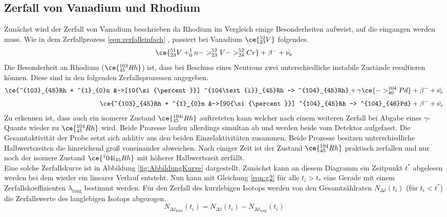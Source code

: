 \subsection{Zerfall von Vanadium und Rhodium}
Zunächst wird der Zerfall von Vanadium beschrieben da Rhodium im Vergleich einige Besonderheiten aufweist, auf die eingangen werden muss.
Wie in dem Zerfallprozess \eqref{eqn:zerfalleinfach} , passiert bei Vanadium $\ce{^{52}_{23}V}$ folgendes.
\begin{equation}
\ce{^{51}_{23}V + ^{1}_{0}n -> ^{52}_{23}V -> ^{52}_{24}Cr} + {\beta}^{-} + \bar{\nu_{e}} 
\end{equation}
Die Besonderheit an Rhodium ($\ce{^{103}_{45}Rh}$) ist, dass bei Beschuss eines Neutrons zwei unterschiedliche instabile Zustände resultieren können. 
Diese sind in den folgenden Zerfallsprozessen angegeben.
\begin{align}
\ce{^{103}_{45}Rh + ^{1}_{0}n &->[10{\si{\percent}}] ^{104\text{i}}_{45}Rh -> ^{104}_{45}Rh} + \gamma \ce{-> ^{104}_{46}Pd} + {\beta}^{-} + \bar{\nu_{e}} \\[3pt]
\ce{^{103}_{45}Rh + ^{1}_{0}n &->[90{\si{\percent}}] ^{104}_{45}Rh -> ^{104}_{46}Pd} + {\beta}^{-} + \bar{\nu_{e}} 
\end{align}
Zu erkennen ist, dass auch ein isomerer Zustand $\ce{^{104{\text{i}}}_{45}Rh}$ auftreteten kann welcher nach einem weiteren Zerfall bei Abgabe eines $\gamma$-Quants wieder zu $\ce{^{104}_{45}Rh}$ wird.
Beide Prozesse laufen allerdings simultan ab und werden beide vom Detektor aufgefasst. 
Die Gesamtaktivität der Probe setzt sich additiv aus den beiden Einzelaktivitäten zusammen. Beide Prozesse besitzen unterschiedliche Halbwertszeiten die hinreichend
groß voneinander abweichen. Nach einiger Zeit ist der Zustand $\ce{^{104}_{45}Rh}$ praktisch zerfallen und nur noch der isomere Zustand $\ce{^104{\text{i}}_{45}Rh}$ mit höherer Halbwertszeit zerfällt.
\\
\newline
Eine solche Zerfallskurve ist in Abbildung \ref{fig:AbbildungKurve} dargestellt.
Zunächst kann an diesem Diagramm ein Zeitpunkt $t^{*}$ abgelesen werden bei dem wieder ein linearer Verlauf entsteht. Nun kann mit Gleichung 
\eqref{eqn:g2} für alle $t_{i} > t_{*}$ eine Gerade mit einem Zerfallskoeffizienten $\lambda_{\text{lang}}$ bestimmt werden.
Für den Zerfall des kurzlebigen Isotops werden von den Gesamtzählraten $N_{\increment t}(t_{i})$ (für $t_{i} < t^{*}$) die Zerfallswerte des langlebigen Isotops abgezogen.
\begin{equation}
N_{{\increment t}_{\text{kurz}}}(t_{i}) = N_{\increment t}(t_{i}) - N_{{\increment t}_{\text{lang}}}(t_{i})
\end{equation}
